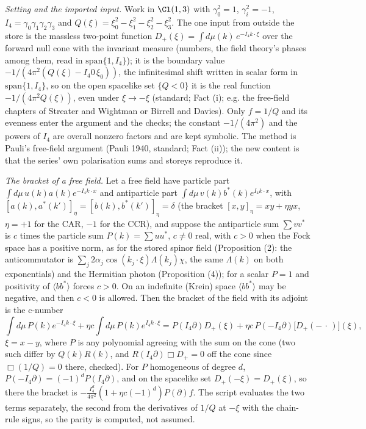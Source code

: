 \emph{Setting and the imported input.} Work in $\Cl(1,3)$ with $\gamma_{0}^{2} = 1$, $\gamma_{i}^{2} = -1$, $I_{4} = \gamma_{0}\gamma_{1}\gamma_{2}\gamma_{3}$ and $Q(\xi) = \xi_{0}^{2} - \xi_{1}^{2} - \xi_{2}^{2} - \xi_{3}^{2}$. The one input from outside the store is the massless two-point function $D_{+}(\xi) = \int d\mu(k)\, e^{-I_{4}k\cdot\xi}$ over the forward null cone with the invariant measure (numbers, the field theory's phases among them, read in $\mathrm{span}\{1, I_{4}\}$); it is the boundary value $-1/(4\pi^{2}(Q(\xi) - I_{4}0\,\xi_{0}))$, the infinitesimal shift written in scalar form in $\mathrm{span}\{1, I_{4}\}$, so on the open spacelike set $\{Q < 0\}$ it is the real function $-1/(4\pi^{2}Q(\xi))$, even under $\xi \to -\xi$ (standard; Fact (i); e.g. the free-field chapters of Streater and Wightman or Birrell and Davies). Only $f = 1/Q$ and its evenness enter the argument and the checks; the constant $-1/(4\pi^{2})$ and the powers of $I_{4}$ are overall nonzero factors and are kept symbolic. The method is Pauli's free-field argument (Pauli 1940, standard; Fact (ii)); the new content is that the series' own polarisation sums and storeys reproduce it.

\emph{The bracket of a free field.} Let a free field have particle part $\int d\mu\, u(k)a(k)e^{-I_{4}k\cdot x}$ and antiparticle part $\int d\mu\, v(k)b^{*}(k)e^{I_{4}k\cdot x}$, with $[a(k), a^{*}(k')]_{\eta} = [b(k), b^{*}(k')]_{\eta} = \delta$ (the bracket $[x, y]_{\eta} = xy + \eta yx$, $\eta = +1$ for the CAR, $-1$ for the CCR), and suppose the antiparticle sum $\sum vv^{*}$ is $c$ times the particle sum $P(k) = \sum uu^{*}$, $c \neq 0$ real, with $c > 0$ when the Fock space has a positive norm, as for the stored spinor field (Proposition (2): the anticommutator is $\sum_{j} 2\alpha_{j}\cos(k_{j}\cdot\xi)\Lambda(k_{j})\chi$, the same $\Lambda(k)$ on both exponentials) and the Hermitian photon (Proposition (4)); for a scalar $P = 1$ and positivity of $\langle bb^{*}\rangle$ forces $c > 0$. On an indefinite (Krein) space $\langle bb^{*}\rangle$ may be negative, and then $c < 0$ is allowed. Then the bracket of the field with its adjoint is the c-number
\[
\int d\mu\,P(k)e^{-I_{4}k\cdot\xi} + \eta c\int d\mu\,P(k)e^{I_{4}k\cdot\xi} = P(I_{4}\partial)D_{+}(\xi) + \eta c\,P(-I_{4}\partial)\bigl[D_{+}(-\,\cdot\,)\bigr](\xi),
\]
$\xi = x - y$, where $P$ is any polynomial agreeing with the sum on the cone (two such differ by $Q(k)R(k)$, and $R(I_{4}\partial)\Box D_{+} = 0$ off the cone since $\Box(1/Q) = 0$ there, checked). For $P$ homogeneous of degree $d$, $P(-I_{4}\partial) = (-1)^{d}P(I_{4}\partial)$, and on the spacelike set $D_{+}(-\xi) = D_{+}(\xi)$, so there the bracket is $-\tfrac{I_{4}^{d}}{4\pi^{2}}(1 + \eta c(-1)^{d})P(\partial)f$. The script evaluates the two terms separately, the second from the derivatives of $1/Q$ at $-\xi$ with the chain-rule signs, so the parity is computed, not assumed.

